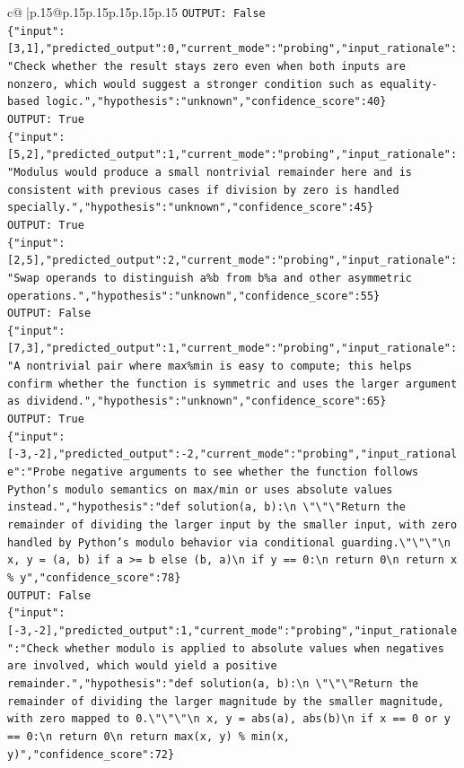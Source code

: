 \documentclass{article}
\begin{document}
{\begin{supertabular}{c@{$\;$}|p{.15\linewidth}@{}p{.15\linewidth}p{.15\linewidth}p{.15\linewidth}p{.15\linewidth}p{.15\linewidth}}
{{{\texttt{OUTPUT: False} \\
\texttt{\{"input":{[}3,1{]},"predicted\_output":0,"current\_mode":"probing","input\_rationale":"Check whether the result stays zero even when both inputs are nonzero, which would suggest a stronger condition such as equality{-}based logic.","hypothesis":"unknown","confidence\_score":40\}} \\
\texttt{OUTPUT: True} \\
\texttt{\{"input":{[}5,2{]},"predicted\_output":1,"current\_mode":"probing","input\_rationale":"Modulus would produce a small nontrivial remainder here and is consistent with previous cases if division by zero is handled specially.","hypothesis":"unknown","confidence\_score":45\}} \\
\texttt{OUTPUT: True} \\
\texttt{\{"input":{[}2,5{]},"predicted\_output":2,"current\_mode":"probing","input\_rationale":"Swap operands to distinguish a\%b from b\%a and other asymmetric operations.","hypothesis":"unknown","confidence\_score":55\}} \\
\texttt{OUTPUT: False} \\
\texttt{\{"input":{[}7,3{]},"predicted\_output":1,"current\_mode":"probing","input\_rationale":"A nontrivial pair where max\%min is easy to compute; this helps confirm whether the function is symmetric and uses the larger argument as dividend.","hypothesis":"unknown","confidence\_score":65\}} \\
\texttt{OUTPUT: True} \\
\texttt{\{"input":{[}{-}3,{-}2{]},"predicted\_output":{-}2,"current\_mode":"probing","input\_rationale":"Probe negative arguments to see whether the function follows Python's modulo semantics on max/min or uses absolute values instead.","hypothesis":"def solution(a, b):\textbackslash{}n    \textbackslash{}"\textbackslash{}"\textbackslash{}"Return the remainder of dividing the larger input by the smaller input, with zero handled by Python's modulo behavior via conditional guarding.\textbackslash{}"\textbackslash{}"\textbackslash{}"\textbackslash{}n    x, y = (a, b) if a >= b else (b, a)\textbackslash{}n    if y == 0:\textbackslash{}n        return 0\textbackslash{}n    return x \% y","confidence\_score":78\}} \\
\texttt{OUTPUT: False} \\
\texttt{\{"input":{[}{-}3,{-}2{]},"predicted\_output":1,"current\_mode":"probing","input\_rationale":"Check whether modulo is applied to absolute values when negatives are involved, which would yield a positive remainder.","hypothesis":"def solution(a, b):\textbackslash{}n    \textbackslash{}"\textbackslash{}"\textbackslash{}"Return the remainder of dividing the larger magnitude by the smaller magnitude, with zero mapped to 0.\textbackslash{}"\textbackslash{}"\textbackslash{}"\textbackslash{}n    x, y = abs(a), abs(b)\textbackslash{}n    if x == 0 or y == 0:\textbackslash{}n        return 0\textbackslash{}n    return max(x, y) \% min(x, y)","confidence\_score":72\}} \\
}}}
\end{supertabular}}
\end{document}
